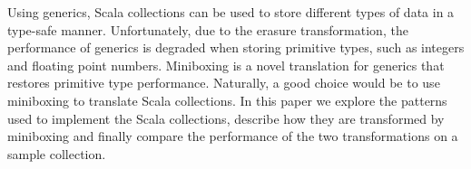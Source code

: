 Using generics, Scala collections can be used to store different types of data in a type-safe manner. Unfortunately, due to the erasure transformation, the performance of generics is degraded when storing primitive types, such as integers and floating point numbers. Miniboxing is a novel translation for generics that restores primitive type performance. Naturally, a good choice would be to use miniboxing to translate Scala collections. In this paper we explore the patterns used to implement the Scala collections, describe how they are transformed by miniboxing and finally compare the performance of the two transformations on a sample collection.